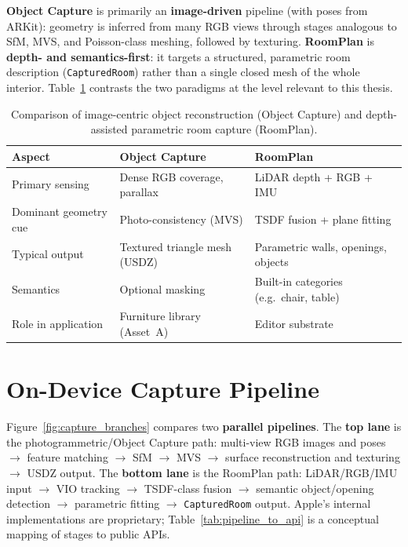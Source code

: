 \textbf{Object Capture} is primarily an \textbf{image-driven} pipeline (with poses from ARKit): geometry is inferred from many RGB views through stages analogous to SfM, MVS, and Poisson-class meshing, followed by texturing. \textbf{RoomPlan} is \textbf{depth- and semantics-first}: it targets a structured, parametric room description (\texttt{CapturedRoom}) rather than a single closed mesh of the whole interior. Table~\ref{tab:depth_vs_photo} contrasts the two paradigms at the level relevant to this thesis.

\begin{table}[htbp]
\centering
\caption{Comparison of image-centric object reconstruction (Object Capture) and depth-assisted parametric room capture (RoomPlan).}
\label{tab:depth_vs_photo}
\begin{tabular}{|p{}|p{}|p{}|}
\hline
\textbf{Aspect} & \textbf{Object Capture} & \textbf{RoomPlan} \\
\hline
Primary sensing & Dense RGB coverage, parallax & LiDAR depth + RGB + IMU \\
\hline
Dominant geometry cue & Photo-consistency (MVS) & TSDF fusion + plane fitting \\
\hline
Typical output & Textured triangle mesh (USDZ) & Parametric walls, openings, objects \\
\hline
Semantics & Optional masking & Built-in categories (e.g.\ chair, table) \\
\hline
Role in application & Furniture library (Asset~A) & Editor substrate \\
\hline
\end{tabular}
\end{table}

\section{On-Device Capture Pipeline}
\label{sec:on_device_pipeline}

Figure~\ref{fig:capture_branches} compares two \textbf{parallel pipelines}. The \textbf{top lane} is the photogrammetric/Object Capture path: multi-view RGB images and poses $\rightarrow$ feature matching $\rightarrow$ SfM $\rightarrow$ MVS $\rightarrow$ surface reconstruction and texturing $\rightarrow$ USDZ output. The \textbf{bottom lane} is the RoomPlan path: LiDAR/RGB/IMU input $\rightarrow$ VIO tracking $\rightarrow$ TSDF-class fusion $\rightarrow$ semantic object/opening detection $\rightarrow$ parametric fitting $\rightarrow$ \texttt{CapturedRoom} output. Apple's internal implementations are proprietary; Table~\ref{tab:pipeline_to_api} is a conceptual mapping of stages to public APIs.


